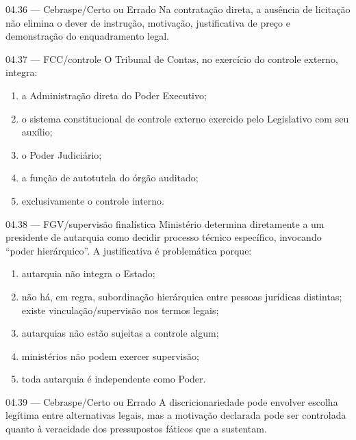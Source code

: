 \begin{questao}{ 04.36 — Cebraspe/Certo ou Errado}
Na contratação direta, a ausência de licitação não elimina o dever de instrução, motivação, justificativa de preço e demonstração do enquadramento legal.
\end{questao}

\begin{questao}{ 04.37 — FCC/controle}
O Tribunal de Contas, no exercício do controle externo, integra:
\begin{enumerate}[label=\Alph*)]
\item a Administração direta do Poder Executivo;
\item o sistema constitucional de controle externo exercido pelo Legislativo com seu auxílio;
\item o Poder Judiciário;
\item a função de autotutela do órgão auditado;
\item exclusivamente o controle interno.
\end{enumerate}
\end{questao}

\begin{questao}{ 04.38 — FGV/supervisão finalística}
Ministério determina diretamente a um presidente de autarquia como decidir processo técnico específico, invocando ``poder hierárquico''. A justificativa é problemática porque:
\begin{enumerate}[label=\Alph*)]
\item autarquia não integra o Estado;
\item não há, em regra, subordinação hierárquica entre pessoas jurídicas distintas; existe vinculação/supervisão nos termos legais;
\item autarquias não estão sujeitas a controle algum;
\item ministérios não podem exercer supervisão;
\item toda autarquia é independente como Poder.
\end{enumerate}
\end{questao}

\begin{questao}{ 04.39 — Cebraspe/Certo ou Errado}
A discricionariedade pode envolver escolha legítima entre alternativas legais, mas a motivação declarada pode ser controlada quanto à veracidade dos pressupostos fáticos que a sustentam.
\end{questao}


